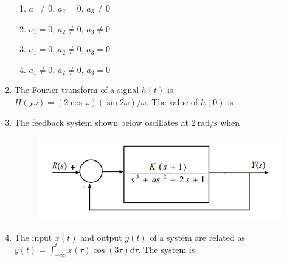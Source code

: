 \documentclass[journal,12pt,onecolumn]{IEEEtran}
\theoremstyle{remark}
\begin{document}
\begin{enumerate}[start=1, label=Q.\arabic*]
\begin{enumerate}
    \item $a_{1}\ne0$, $a_{2}=0$, $a_{3}\ne0$
    \item $a_{1}=0$, $a_{2}\ne0$, $a_{3}\ne0$
    \item $a_{1}=0$, $a_{2}\ne0$, $a_{3}=0$
    \item $a_{1}\ne0$, $a_{2}\ne0$, $a_{3}=0$
\end{enumerate}
\hfill{}

\item The Fourier transform of a signal $h(t)$ is $H(j\omega)=(2\cos\omega)(\sin 2\omega)/\omega$. The value of $h(0)$ is

\begin{enumerate}
\end{enumerate}
\hfill{}

\item The feedback system shown below oscillates at $2~\text{rad/s}$ when
\begin{figure}[H]
    \centering
    \includegraphics[width=0.6\columnwidth]{Figures/q41.png}
    \caption{}
\end{figure}

\begin{enumerate}
\end{enumerate}
\hfill{}

\item The input $x(t)$ and output $y(t)$ of a system are related as $y(t)=\int_{-\infty}^{t}x(\tau)\cos(3\tau)d\tau$. The system is


\end{enumerate}
\end{document}

